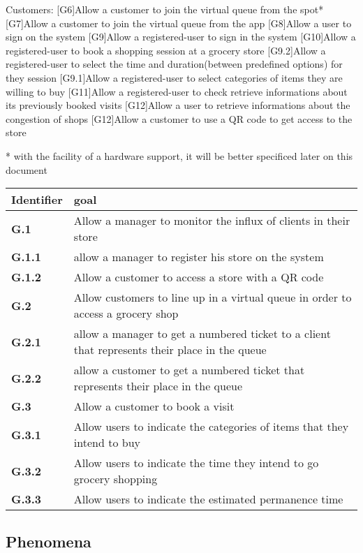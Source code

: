 Customers:
[G6]Allow a customer to join the virtual queue from the spot*
[G7]Allow a customer to join the virtual queue from the app
[G8]Allow a user to sign on the system
[G9]Allow a registered-user to sign in the system
[G10]Allow a registered-user to book a shopping session at a grocery store
    [G9.2]Allow a registered-user to select the time and duration(between 		predefined options) for they session 	
    [G9.1]Allow a registered-user to select categories of items they are 	willing to 
    buy
[G11]Allow a registered-user to check retrieve informations about its previously booked visits
[G12]Allow a user to retrieve informations about the congestion of shops
[G12]Allow a customer to use a QR code to get access to the store 


* with the facility of a hardware support, it will be better specificed later on this document

\begin{tabular}{|l|l|}
    \hline
    \textbf{Identifier} & \textbf{goal}\\
    \hline
    \textbf{G.1} & Allow a manager to monitor the influx of clients in their store\\
    \textbf{G.1.1} & allow a manager to register his store on the system\\
    \textbf{G.1.2} & Allow a customer to access a store with a QR code\\
    \hline
    \textbf{G.2} & Allow customers to line up in a virtual queue in order to access a grocery shop\\
    \textbf{G.2.1} & allow a manager to get a numbered ticket to a client that represents their place in the queue\\
    \textbf{G.2.2} & allow a customer to get a numbered ticket that represents their place in the queue\\
    \hline
    \textbf{G.3} & Allow a customer to book a visit\\
    \textbf{G.3.1} & Allow users to indicate the categories of items that they intend to buy\\
    \textbf{G.3.2} & Allow users to indicate the time they intend to go grocery shopping\\
    \textbf{G.3.3} & Allow users to indicate the estimated permanence time \\
    \hline
\end{tabular}

\subsection{Phenomena}
\label{subsect:phenomena}

